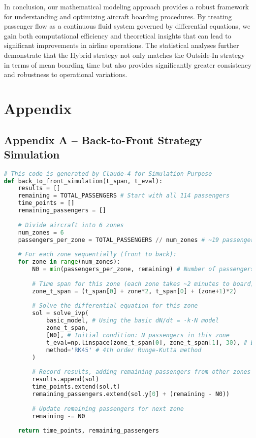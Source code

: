 \documentclass[12pt]{article}
\begin{document}
In conclusion, our mathematical modeling approach provides a robust framework for understanding and optimizing aircraft boarding procedures. By treating passenger flow as a continuous fluid system governed by differential equations, we gain both computational efficiency and theoretical insights that can lead to significant improvements in airline operations. The statistical analyses further demonstrate that the Hybrid strategy not only matches the Outside-In strategy in terms of mean boarding time but also provides significantly greater consistency and robustness to operational variations.

\appendix
\section{Appendix}

\subsection{Appendix A – Back-to-Front Strategy Simulation}

\begin{lstlisting}[language=Python, caption=Back-to-Front Boarding Strategy Simulation, label=lst:back_to_front]
# This code is generated by Claude-4 for Simulation Purpose
def back_to_front_simulation(t_span, t_eval):
    results = []
    remaining = TOTAL_PASSENGERS # Start with all 114 passengers
    time_points = []
    remaining_passengers = []
    
    # Divide aircraft into 6 zones
    num_zones = 6
    passengers_per_zone = TOTAL_PASSENGERS // num_zones # ~19 passengers per zone
    
    # For each zone sequentially (front to back):
    for zone in range(num_zones):
        N0 = min(passengers_per_zone, remaining) # Number of passengers in this zone
        
        # Time span for this zone (each zone takes ~2 minutes to board)
        zone_t_span = (t_span[0] + zone*2, t_span[0] + (zone+1)*2)
        
        # Solve the differential equation for this zone
        sol = solve_ivp(
            basic_model, # Using the basic dN/dt = -k·N model
            zone_t_span,
            [N0], # Initial condition: N passengers in this zone
            t_eval=np.linspace(zone_t_span[0], zone_t_span[1], 30), # Evaluation points
            method='RK45' # 4th order Runge-Kutta method
        )
        
        # Record results, adding remaining passengers from other zones
        results.append(sol)
        time_points.extend(sol.t)
        remaining_passengers.extend(sol.y[0] + (remaining - N0))
        
        # Update remaining passengers for next zone
        remaining -= N0
    
    return time_points, remaining_passengers
\end{lstlisting}
\end{document}

